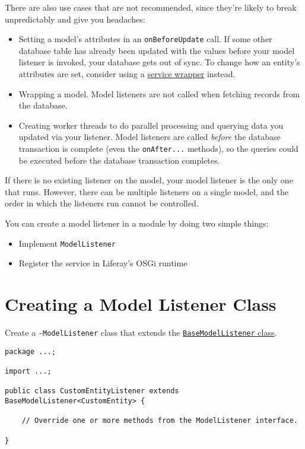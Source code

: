 There are also use cases that are not recommended, since they're likely
to break unpredictably and give you headaches:

\begin{itemize}
\tightlist
\item
  Setting a model's attributes in an \texttt{onBeforeUpdate} call. If
  some other database table has already been updated with the values
  before your model listener is invoked, your database gets out of sync.
  To change how an entity's attributes are set, consider using a
  \href{/docs/7-2/customization/-/knowledge_base/c/overriding-service-builder-services-service-wrappers}{service
  wrapper} instead.
\item
  Wrapping a model. Model listeners are not called when fetching records
  from the database.
\item
  Creating worker threads to do parallel processing and querying data
  you updated via your listener. Model listeners are called
  \emph{before} the database transaction is complete (even the
  \texttt{onAfter...} methods), so the queries could be executed before
  the database transaction completes.
\end{itemize}

If there is no existing listener on the model, your model listener is
the only one that runs. However, there can be multiple listeners on a
single model, and the order in which the listeners run cannot be
controlled.

You can create a model listener in a module by doing two simple things:

\begin{itemize}
\tightlist
\item
  Implement \texttt{ModelListener}
\item
  Register the service in Liferay's OSGi runtime
\end{itemize}

\section{Creating a Model Listener
Class}\label{creating-a-model-listener-class}

Create a \texttt{-ModelListener} class that extends the
\href{https://docs.liferay.com/dxp/portal/7.2-latest/javadocs/portal-kernel/com/liferay/portal/kernel/model/BaseModelListener.html}{\texttt{BaseModelListener}
class}.

\begin{verbatim}
package ...;

import ...;

public class CustomEntityListener extends BaseModelListener<CustomEntity> {

    // Override one or more methods from the ModelListener interface.
    
}
\end{verbatim}

